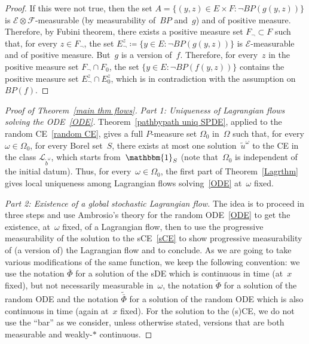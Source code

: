 \documentclass[a4paper,10pt]{article}
\newcommand\1{\mathbbm{1}}
\newcommand{\mc}{\mathcal}
\newcommand{\td}{\tilde}
\numberwithin{equation}{section}
\begin{document}
\begin{proof}
If this were not true, then the set $A=\{(y,z) \in E \times F \colon \neg BP(g(y,z))\}$ is $\mathcal{E} \otimes \mathcal{F}$-measurable (by measurability of~$BP$ and~$g$) and of positive measure. Therefore, by Fubini theorem, there exists a positive measure set $F_{\neg} \subset F$ such that, for every $z \in F_{\neg}$, the set $E_\neg^{z} \coloneqq \{y \in E\colon \neg BP(g(y,z))\}$ is $\mathcal{E}$-measurable and of positive measure. But~$g$ is a version of~$f$. Therefore, for every~$z$ in the positive measure set $F_{\neg}\cap F_0$, the set $\{y \in E \colon\neg BP(f(y,z))\}$ contains the positive measure set $E_\neg^z\cap E_0^z$, which is in contradiction with the assumption on $BP(f)$.
\end{proof}

\begin{proof}[Proof of Theorem~\ref{main thm flows}]
\emph{Part 1: Uniqueness of Lagrangian flows solving the ODE~\eqref{ODE}.} Theorem~\ref{pathbypath uniq SPDE}, applied to the random CE~\eqref{random CE}, gives a full $P$-measure set $\Omega_0$ in~$\Omega$ such that, for every $\omega \in \Omega_0$, for every Borel set~$S$, there exists at most one solution~$\td{u}^\omega$ to the CE in the class $\mc{L}_{\td{b}^\omega}$, which starts from~$\1_S$ (note that~$\Omega_0$ is independent of the initial datum). Thus, for every~$\omega \in \Omega_0$, the first part of Theorem~\ref{Lagrthm} gives local uniqueness among Lagrangian flows solving~\eqref{ODE} at~$\omega$ fixed. 

\emph{Part 2: Existence of a global stochastic Lagrangian flow.} The idea is to proceed in three steps and use Ambrosio's theory for the random ODE~\eqref{ODE} to get the existence, at~$\omega$ fixed, of a Lagrangian flow, then to use the progressive measurability of the solution to the sCE~\eqref{sCE} to show progressive measurability of (a version of) the Lagrangian flow and to conclude. As we are going to take various modifications of the same function, we keep the following convention: we use the notation $\bar{\Phi}$ for a solution of the sDE which is continuous in time (at~$x$ fixed), but not necessarily measurable in~$\omega$, the notation $\td{\Phi}$ for a solution of the random ODE and the notation $\td{\bar{\Phi}}$ for a solution of the random ODE which is also continuous in time (again at~$x$ fixed). For the solution to the (s)CE, we do not use the ``bar'' as we consider, unless otherwise stated, versions that are both measurable and weakly-$*$ continuous.


\end{proof}
\end{document}
